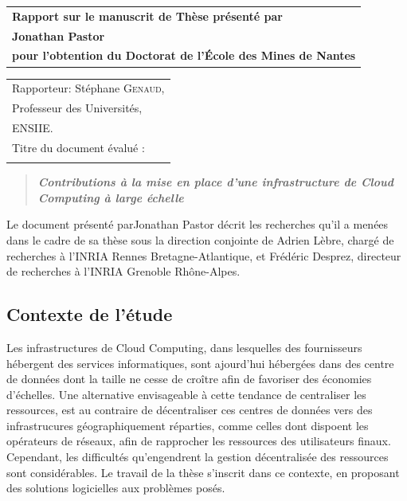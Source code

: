 \documentclass[a4paper,12pt]{article}
\begin{document}
\begin{flushleft}
\begin{tabular}[t]{l}
\Large\textsf{\textbf{Rapport sur le manuscrit de Thèse présenté par}}\\[4mm]
\Large\textsf{\textbf{Jonathan Pastor}}\\[4mm]
\large\textsf{\textbf{pour l'obtention du Doctorat de l'École des Mines de Nantes}}\\
\end{tabular}%

\vspace{4mm}

\noindent%
\begin{tabular}[t]{l}
Rapporteur: Stéphane \textsc{Genaud},\\
Professeur des Universités,\\
ENSIIE.\\[5mm]
Titre du document évalué :\\\\[3mm]
\end{tabular}%

\begin{quote}
\Large \textit{\textsf{\textbf{
Contributions à la mise en place d'une infrastructure de Cloud Computing à large
échelle}}}
\end{quote}

\end{flushleft}

\vspace{3mm}

Le document  présenté parJonathan  Pastor décrit les  recherches qu'il  a menées
dans le cadre de sa thèse sous la direction conjointe de Adrien Lèbre, chargé de
recherches à l'INRIA Rennes  Bretagne-Atlantique, et Frédéric Desprez, directeur
de recherches à l'INRIA Grenoble Rhône-Alpes. 



\subsection*{Contexte de l'étude}

Les  infrastructures  de  Cloud  Computing,  dans  lesquelles  des  fournisseurs
hébergent des services informatiques, sont  ajourd'hui hébergées dans des centre
de données dont  la taille ne cesse  de croître afin de  favoriser des économies
d'échelles. Une  alternative envisageable  à cette  tendance de  centraliser les
ressources, est  au contraire de décentraliser  ces centres de données  vers des
infrastrucures  géographiquement  réparties,  comme  celles  dont  dispoent  les
opérateurs  de  réseaux, afin  de  rapprocher  les ressources  des  utilisateurs
finaux. Cependant,  les difficultés  qu'engendrent la gestion  décentralisée des
ressources  sont  considérables.  Le  travail  de la  thèse  s'inscrit  dans  ce
contexte, en proposant des solutions logicielles aux problèmes posés.
\end{document}

